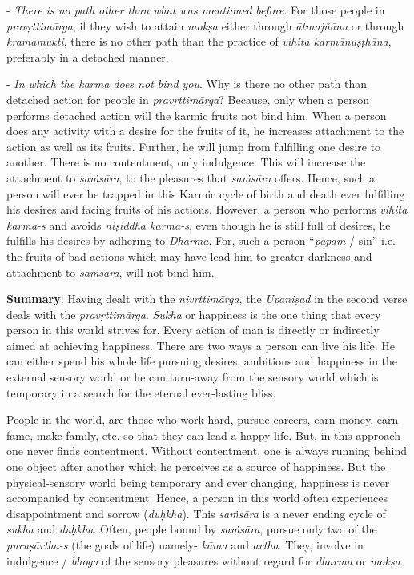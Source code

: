 - \emph{There is no path other than what was mentioned before}. For those people in \emph{pravṛttimārga}, if they wish to attain \emph{mokṣa} either through \emph{ātmajñāna} or through \emph{kramamukti}, there is no other path than the practice of \emph{vihita karmānuṣṭhāna}, preferably in a detached manner.

- \emph{In which the karma does not bind you}. Why is there no other path than detached action for people in \emph{pravṛttimārga}? Because, only when a person performs detached action will the karmic fruits not bind him. When a person does any activity with a desire for the fruits of it, he increases attachment to the action as well as its fruits. Further, he will jump from fulfilling one desire to another. There is no contentment, only indulgence. This will increase the attachment to \emph{saṁsāra}, to the pleasures that \emph{saṁsāra} offers. Hence, such a person will ever be trapped in this Karmic cycle of birth and death ever fulfilling his desires and facing fruits of his actions. However, a person who performs \emph{vihita karma-s} and avoids \emph{niṣiddha karma-s}, even though he is still full of desires, he fulfills his desires by adhering to \emph{Dharma}. For, such a person ``\emph{pāpam} / sin'' i.e. the fruits of bad actions which may have lead him to greater darkness and attachment to \emph{saṁsāra}, will not bind him.

\textbf{Summary}: Having dealt with the \emph{nivṛttimārga}, the \emph{Upaniṣad} in the second verse deals with the \emph{pravṛttimārga}. \emph{Sukha} or happiness is the one thing that every person in this world strives for. Every action of man is directly or indirectly aimed at achieving happiness. There are two ways a person can live his life. He can either spend his whole life pursuing desires, ambitions and happiness in the external sensory world or he can turn-away from the sensory world which is temporary in a search for the eternal ever-lasting bliss.

People in the world, are those who work hard, pursue careers, earn money, earn fame, make family, etc. so that they can lead a happy life. But, in this approach one never finds contentment. Without contentment, one is always running behind one object after another which he perceives as a source of happiness. But the physical-sensory world being temporary and ever changing, happiness is never accompanied by contentment. Hence, a person in this world often experiences disappointment and sorrow (\emph{duḥkha}). This \emph{saṁsāra} is a never ending cycle of \emph{sukha} and \emph{duḥkha}. Often, people bound by \emph{saṁsāra}, pursue only two of the \emph{puruṣārtha-s} (the goals of life) namely- \emph{kāma} and \emph{artha}. They, involve in indulgence / \emph{bhoga} of the sensory pleasures without regard for \emph{dharma} or \emph{mokṣa}.

